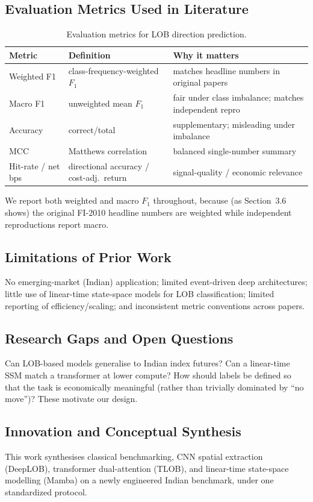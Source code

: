 \documentclass[11pt]{article}
\begin{document}
\subsection{Evaluation Metrics Used in Literature}
\begin{table}[h]
\centering
\caption{Evaluation metrics for LOB direction prediction.}
\begin{tabular}{@{}lll@{}}
\toprule
\textbf{Metric} & \textbf{Definition} & \textbf{Why it matters} \\
\midrule
Weighted F1 & class-frequency-weighted $F_1$ & matches headline numbers in original papers \\
Macro F1 & unweighted mean $F_1$ & fair under class imbalance; matches independent repro \\
Accuracy & correct/total & supplementary; misleading under imbalance \\
MCC & Matthews correlation & balanced single-number summary \\
Hit-rate / net bps & directional accuracy / cost-adj.\ return & signal-quality / economic relevance \\
\bottomrule
\end{tabular}
\end{table}
We report both weighted and macro $F_1$ throughout, because (as Section~3.6 shows) the original FI-2010
headline numbers are weighted while independent reproductions report macro.

\subsection{Limitations of Prior Work}
No emerging-market (Indian) application; limited event-driven deep architectures; little use of
linear-time state-space models for LOB classification; limited reporting of efficiency/scaling; and
inconsistent metric conventions across papers.

\subsection{Research Gaps and Open Questions}
Can LOB-based models generalise to Indian index futures? Can a linear-time SSM match a transformer at
lower compute? How should labels be defined so that the task is economically meaningful (rather than
trivially dominated by ``no move'')? These motivate our design.

\subsection{Innovation and Conceptual Synthesis}
This work synthesises classical benchmarking, CNN spatial extraction (DeepLOB), transformer dual-attention
(TLOB), and linear-time state-space modelling (Mamba) on a newly engineered Indian benchmark, under one
standardized protocol.
\end{document}
